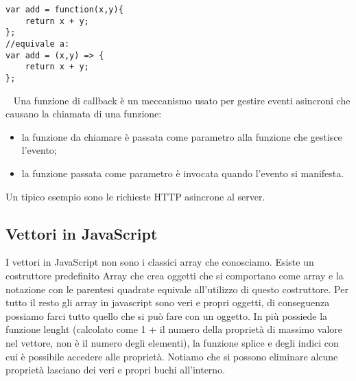 \begin{lstlisting}
var add = function(x,y){
    return x + y;
};
//equivale a:
var add = (x,y) => {
    return x + y;
};
\end{lstlisting}
\ \newline
Una funzione di callback è un meccanismo usato per gestire eventi asincroni che causano la chiamata di una funzione:
\begin{itemize}
    \item la funzione da chiamare è passata come parametro alla funzione che gestisce l'evento;
    \item la funzione passata come parametro è invocata quando l'evento si manifesta.
\end{itemize}
Un tipico esempio sono le richieste HTTP asincrone al server.
\newpage
\subsection{Vettori in JavaScript}
I vettori in JavaScript non sono i classici array che conosciamo. Esiste un costruttore predefinito Array che crea oggetti che si comportano come array e la notazione con le parentesi quadrate equivale all'utilizzo di questo costruttore.\newline
\newline
Per tutto il resto gli array in javascript sono veri e propri oggetti, di conseguenza possiamo farci tutto quello che si può fare con un oggetto. In più possiede la funzione lenght (calcolato come 1 + il numero della proprietà di massimo valore nel vettore, non è il numero degli elementi), la funzione splice e degli indici con cui è possibile accedere alle proprietà. Notiamo che si possono eliminare alcune proprietà lasciano dei veri e propri buchi all'interno.